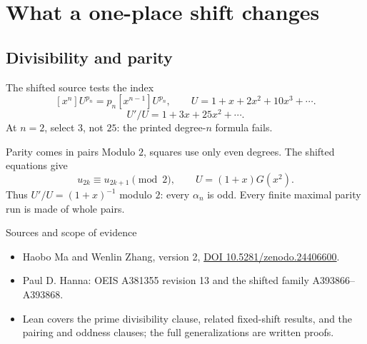 \documentclass{beamer}
\begin{document}
\section{What a one-place shift changes}
\subsection{Divisibility and parity}
\begin{frame}{The shifted source tests the index}
  \[ [x^n]U^{p_n}=p_n[x^{n-1}]U^{p_n},\qquad U=1+x+2x^2+10x^3+\cdots. \]
  \[ U'/U=1+3x+25x^2+\cdots. \]
  At $n=2$, select $3$, not $25$: the printed degree-$n$ formula fails.
\end{frame}
\begin{frame}{Parity comes in pairs}
  Modulo $2$, squares use only even degrees. The shifted equations give
  \[ u_{2k}\equiv u_{2k+1}\pmod{2},\qquad U=(1+x)G(x^2). \]
  Thus $U'/U=(1+x)^{-1}$ modulo $2$: every $\alpha_n$ is odd.
  Every finite maximal parity run is made of whole pairs.
\end{frame}
\begin{frame}{Sources and scope of evidence}
  \begin{itemize}
    \item Haobo Ma and Wenlin Zhang, version 2, \href{https://doi.org/10.5281/zenodo.24406600}{DOI 10.5281/zenodo.24406600}.
    \item Paul D. Hanna: OEIS A381355 revision 13 and the shifted family A393866--A393868.
    \item Lean covers the prime divisibility clause, related fixed-shift results, and the pairing and oddness clauses; the full generalizations are written proofs.
  \end{itemize}
\end{frame}
\end{document}
